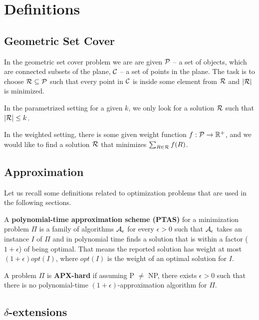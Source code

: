 \chapter{Definitions}

\section{Geometric Set Cover}

In the geometric set cover problem we are are given
$\mathcal{P}$ -- a set of objects, which are connected
subsets of the plane, $\mathcal{C}$ -- a set of points in the plane.
The task is to choose $\mathcal{R} \subseteq \mathcal{P}$ such that
every point in $\mathcal{C}$ is inside some element from $\mathcal{R}$
and $|\mathcal{R}|$ is minimized.

In the parametrized setting for a given $k$,
we only look for a solution $\mathcal{R}$ such that $|\mathcal{R}| \le k$.


In the weighted setting, there is some given weight function
$f : \mathcal{P} \rightarrow \mathbb{R^+}$,
and we would like to find a solution $\mathcal{R}$
that minimizes $\sum_{R \in \mathcal{R}} f(R)$.

\section{Approximation}

Let us recall some definitions related to optimization problems
that are used in the following sections.

\begin{defi}
A \textbf{polynomial-time approximation scheme (PTAS)}
for a minimization problem $\Pi$
is a family of algorithms $\cal{A}_\epsilon$ for
every $\epsilon > 0$
such that $\cal{A}_\epsilon$ takes an instance $I$ of $\Pi$
and in polynomial time
finds a solution that is within a factor
($1+\epsilon$) of being optimal.
That means the reported solution has weight at most
$(1+\epsilon)opt(I)$, where $opt(I)$ is the weight
of an optimal solution for $I$.
\end{defi}

\begin{defi}
A problem $\Pi$ is \textbf{APX-hard} if assuming P $\neq$ NP,
there exists $\epsilon > 0$
such that there is no polynomial-time $(1+\epsilon)$-approximation algorithm
for $\Pi$.
\end{defi}

\section{$\delta$-extensions}

